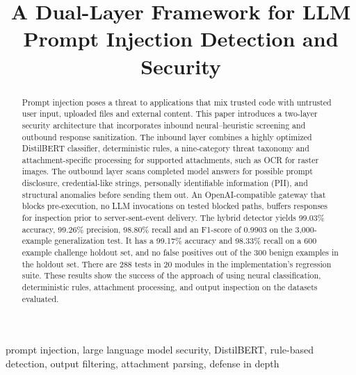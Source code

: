 \documentclass[conference]{IEEEtran}
\begin{document}
\title{A Dual-Layer Framework for LLM Prompt Injection Detection and Security}

\author{
}

\maketitle

\begin{abstract}
Prompt injection poses a threat to applications that mix trusted code with untrusted user input, uploaded files and external content. This paper introduces a two-layer security architecture that incorporates inbound neural--heuristic screening and outbound response sanitization. The inbound layer combines a highly optimized DistilBERT classifier, deterministic rules, a nine-category threat taxonomy and attachment-specific processing for supported attachments, such as OCR for raster images. The outbound layer scans completed model answers for possible prompt disclosure, credential-like strings, personally identifiable information (PII), and structural anomalies before sending them out. An OpenAI-compatible gateway that blocks pre-execution, no LLM invocations on tested blocked paths, buffers responses for inspection prior to server-sent-event delivery. The hybrid detector yields 99.03\% accuracy, 99.26\% precision, 98.80\% recall and an F1-score of 0.9903 on the 3,000-example generalization test. It has a 99.17\% accuracy and 98.33\% recall on a 600 example challenge holdout set, and no false positives out of the 300 benign examples in the holdout set. There are 288 tests in 20 modules in the implementation's regression suite. These results show the success of the approach of using neural classification, deterministic rules, attachment processing, and output inspection on the datasets evaluated.
\end{abstract}

\begin{IEEEkeywords}
prompt injection, large language model security, DistilBERT, rule-based detection, output filtering, attachment parsing, defense in depth
\end{IEEEkeywords}
\end{document}
